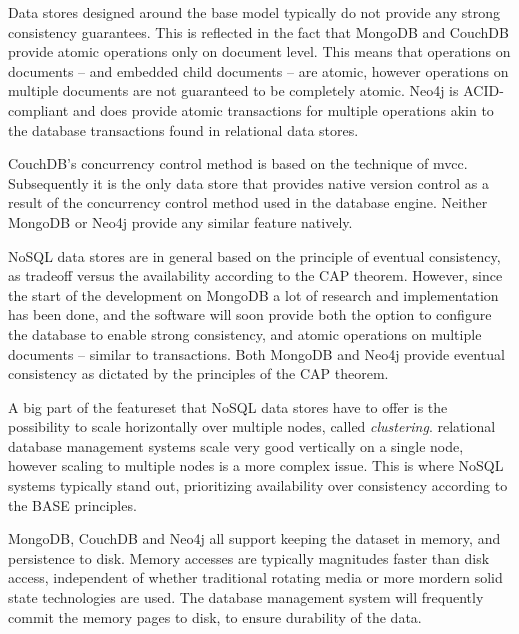 Data stores designed around the \gls{base} model typically do not provide any strong consistency guarantees.
This is reflected in the fact that MongoDB and CouchDB provide atomic operations only on document level.
This means that operations on documents -- and embedded child documents -- are atomic, however operations on multiple documents are not guaranteed to be completely atomic.
Neo4j is ACID-compliant and does provide atomic transactions for multiple operations akin to the database transactions found in relational data stores.

CouchDB's concurrency control method is based on the technique of \gls{mvcc}.
Subsequently it is the only data store that provides native version control as a result of the concurrency control method used in the database engine.
Neither MongoDB or Neo4j provide any similar feature natively.

NoSQL data stores are in general based on the principle of eventual consistency, as tradeoff versus the availability according to the CAP theorem.
However, since the start of the development on MongoDB a lot of research and implementation has been done, and the software will soon provide both the option to configure the database to enable strong consistency, and atomic operations on multiple documents -- similar to transactions.
Both MongoDB and Neo4j provide eventual consistency as dictated by the principles of the CAP theorem.

\begin{landscape}
  
\end{landscape}

A big part of the featureset that NoSQL data stores have to offer is the possibility to scale horizontally over multiple nodes, called \textit{clustering}.
 relational database management systems scale very good vertically on a single node, however scaling to multiple nodes is a more complex issue.
This is where NoSQL systems typically stand out, prioritizing availability over consistency according to the BASE principles.

MongoDB, CouchDB and Neo4j all support keeping the dataset in memory, and persistence to disk.
Memory accesses are typically magnitudes faster than disk access, independent of whether traditional rotating media or more mordern solid state technologies are used.
The database management system will frequently commit the memory pages to disk, to ensure durability of the data.


